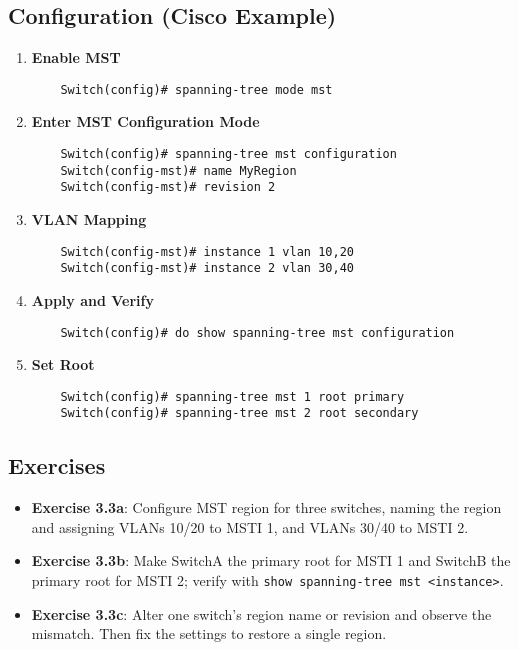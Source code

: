 \documentclass[a4paper]{report}
\begin{document}
\subsection{Configuration (Cisco Example)}
\begin{enumerate}
    \item \textbf{Enable MST}
    \begin{lstlisting}
    Switch(config)# spanning-tree mode mst
    \end{lstlisting}
    \item \textbf{Enter MST Configuration Mode}
    \begin{lstlisting}
    Switch(config)# spanning-tree mst configuration
    Switch(config-mst)# name MyRegion
    Switch(config-mst)# revision 2
    \end{lstlisting}
    \item \textbf{VLAN Mapping}
    \begin{lstlisting}
    Switch(config-mst)# instance 1 vlan 10,20
    Switch(config-mst)# instance 2 vlan 30,40
    \end{lstlisting}
    \item \textbf{Apply and Verify}
    \begin{lstlisting}
    Switch(config)# do show spanning-tree mst configuration
    \end{lstlisting}
    \item \textbf{Set Root}
    \begin{lstlisting}
    Switch(config)# spanning-tree mst 1 root primary
    Switch(config)# spanning-tree mst 2 root secondary
    \end{lstlisting}
\end{enumerate}

\subsection{Exercises}
\begin{itemize}
    \item \textbf{Exercise 3.3a}: Configure MST region for three switches, naming the region and assigning VLANs 10/20 to MSTI 1, and VLANs 30/40 to MSTI 2.
    \item \textbf{Exercise 3.3b}: Make SwitchA the primary root for MSTI 1 and SwitchB the primary root for MSTI 2; verify with \texttt{show spanning-tree mst <instance>}.
    \item \textbf{Exercise 3.3c}: Alter one switch’s region name or revision and observe the mismatch. Then fix the settings to restore a single region.
\end{itemize}
\end{document}
